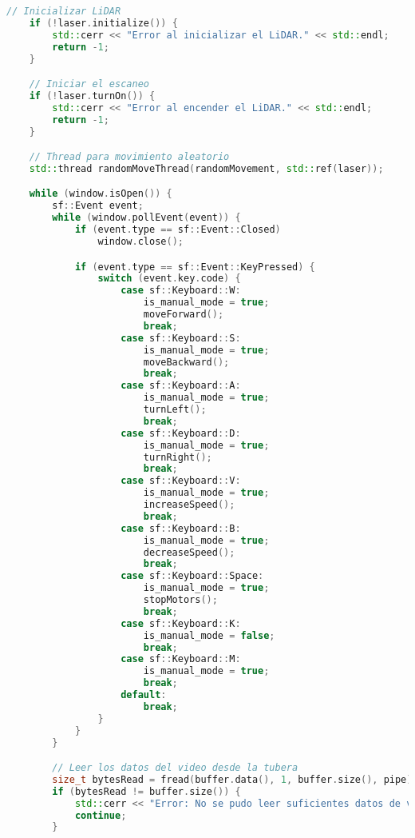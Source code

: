 \begin{lstlisting}[language={C++}, caption={Primer ajuste de c\'odigo}, label={Script}]
    // Inicializar LiDAR
    if (!laser.initialize()) {
        std::cerr << "Error al inicializar el LiDAR." << std::endl;
        return -1;
    }

    // Iniciar el escaneo
    if (!laser.turnOn()) {
        std::cerr << "Error al encender el LiDAR." << std::endl;
        return -1;
    }

    // Thread para movimiento aleatorio
    std::thread randomMoveThread(randomMovement, std::ref(laser));

    while (window.isOpen()) {
        sf::Event event;
        while (window.pollEvent(event)) {
            if (event.type == sf::Event::Closed)
                window.close();

            if (event.type == sf::Event::KeyPressed) {
                switch (event.key.code) {
                    case sf::Keyboard::W:
                        is_manual_mode = true;
                        moveForward();
                        break;
                    case sf::Keyboard::S:
                        is_manual_mode = true;
                        moveBackward();
                        break;
                    case sf::Keyboard::A:
                        is_manual_mode = true;
                        turnLeft();
                        break;
                    case sf::Keyboard::D:
                        is_manual_mode = true;
                        turnRight();
                        break;
                    case sf::Keyboard::V:
                        is_manual_mode = true;
                        increaseSpeed();
                        break;
                    case sf::Keyboard::B:
                        is_manual_mode = true;
                        decreaseSpeed();
                        break;
                    case sf::Keyboard::Space:
                        is_manual_mode = true;
                        stopMotors();
                        break;
                    case sf::Keyboard::K:
                        is_manual_mode = false;
                        break;
                    case sf::Keyboard::M:
                        is_manual_mode = true;
                        break;
                    default:
                        break;
                }
            }
        }

        // Leer los datos del video desde la tubera
        size_t bytesRead = fread(buffer.data(), 1, buffer.size(), pipe);
        if (bytesRead != buffer.size()) {
            std::cerr << "Error: No se pudo leer suficientes datos de video." << std::endl;
            continue;
        }


\end{lstlisting}
